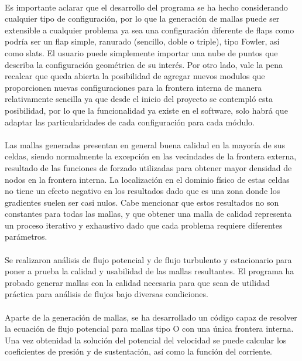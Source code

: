\documentclass[letterpaper, openright, 12pt]{book}
\begin{document}
\paragraph*{}
    Es importante aclarar que el desarrollo del programa se ha hecho
    considerando cualquier tipo de configuración, por lo que la generación de
    mallas puede ser extensible a cualquier problema ya sea una configuración
    diferente de flaps como podría ser un flap simple, ranurado (sencillo,
    doble o triple), tipo Fowler, así como slats. El usuario puede simplemente
    importar una nube de puntos que describa la configuración geométrica de su
    interés. Por otro lado, vale la pena recalcar que queda abierta la
    posibilidad de agregar nuevos modulos que proporcionen nuevas
    configuraciones para la frontera interna de manera relativamente sencilla
    ya que desde el inicio del proyecto se contempló esta posibilidad, por lo
    que la funcionalidad ya existe en el software, solo habrá que adaptar las
    particularidades de cada configuración para cada módulo.

\paragraph*{}
    Las mallas generadas presentan en general buena calidad en la mayoría de sus
    celdas, siendo normalmente la excepción en las vecindades de la frontera
    externa, resultado de las funciones de forzado utilizadas para obtener
    mayor densidad de nodos en la frontera interna. La localización en el
    dominio físico de estas celdas no tiene un efecto negativo en los
    resultados dado que es una zona donde los gradientes suelen ser casi nulos.
    Cabe mencionar que estos resultados no son constantes para todas las
    mallas, y que obtener una malla de calidad representa un proceso iterativo
    y exhaustivo dado que cada problema requiere diferentes parámetros.

\paragraph*{}
    Se realizaron análisis de flujo potencial y de flujo turbulento y
    estacionario para poner a prueba la calidad y usabilidad de las mallas
    resultantes. El programa ha probado generar mallas con la calidad necesaria
    para que sean de utilidad práctica para análisis de flujos bajo diversas
    condiciones.

\paragraph*{}
    Aparte de la generación de mallas, se ha desarrollado un código capaz de
    resolver la ecuación de flujo potencial para mallas tipo O con una única
    frontera interna. Una vez obtenidad la solución del potencial del velocidad
    se puede calcular los coeficientes de presión y de sustentación, así como
    la función del corriente.
\end{document}
